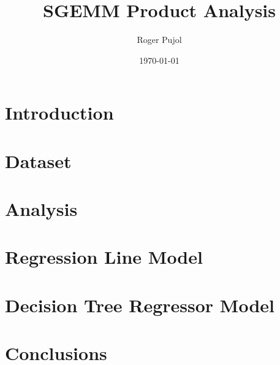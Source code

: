 \documentclass[sigconf,authorversion]{acmart}
\title{SGEMM Product Analysis}
\author{Roger Pujol}
\affiliation{%
  \institution{Universitat Politècnica de Catalunya (UPC)}
  \city{Barcelona}
  \country{Spain}}
\date{\today}
\begin{document}
\maketitle

\section{Introduction}
\section{Dataset}
\section{Analysis}
\section{Regression Line Model}
\section{Decision Tree Regressor Model}
\section{Conclusions}
\end{document}
